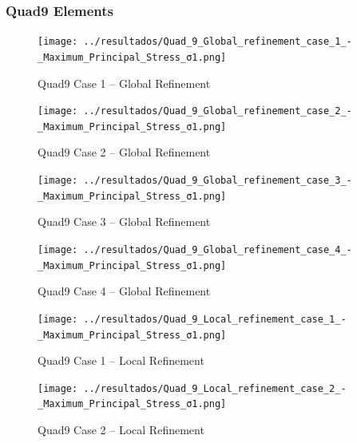 \documentclass[12pt]{article}
\begin{document}
\newpage
\subsubsection{Quad9 Elements}

\begin{figure}[H]
    \centering
    \begin{minipage}{0.48\textwidth}
        \centering
        \texttt{[image: ../resultados/Quad\_9\_Global\_refinement\_case\_1\_-\_Maximum\_Principal\_Stress\_σ1.png]}
        \caption{Quad9 Case 1 – Global Refinement}
        \label{fig:quad9_results_global1}
    \end{minipage}
    \hfill
    \begin{minipage}{0.48\textwidth}
        \centering
        \texttt{[image: ../resultados/Quad\_9\_Global\_refinement\_case\_2\_-\_Maximum\_Principal\_Stress\_σ1.png]}
        \caption{Quad9 Case 2 – Global Refinement}
        \label{fig:quad9_results_global2}
    \end{minipage}
\end{figure}

\begin{figure}[H]
    \centering
    \begin{minipage}{0.48\textwidth}
        \centering
        \texttt{[image: ../resultados/Quad\_9\_Global\_refinement\_case\_3\_-\_Maximum\_Principal\_Stress\_σ1.png]}
        \caption{Quad9 Case 3 – Global Refinement}
        \label{fig:quad9_results_global3}
    \end{minipage}
    \hfill
    \begin{minipage}{0.48\textwidth}
        \centering
        \texttt{[image: ../resultados/Quad\_9\_Global\_refinement\_case\_4\_-\_Maximum\_Principal\_Stress\_σ1.png]}
        \caption{Quad9 Case 4 – Global Refinement}
        \label{fig:quad9_results_global4}
    \end{minipage}
\end{figure}

\begin{figure}[H]
    \centering
    \begin{minipage}{0.48\textwidth}
        \centering
        \texttt{[image: ../resultados/Quad\_9\_Local\_refinement\_case\_1\_-\_Maximum\_Principal\_Stress\_σ1.png]}
        \caption{Quad9 Case 1 – Local Refinement}
        \label{fig:quad9_results_local1}
    \end{minipage}
    \hfill
    \begin{minipage}{0.48\textwidth}
        \centering
        \texttt{[image: ../resultados/Quad\_9\_Local\_refinement\_case\_2\_-\_Maximum\_Principal\_Stress\_σ1.png]}
        \caption{Quad9 Case 2 – Local Refinement}
        \label{fig:quad9_results_local2}
    \end{minipage}
\end{figure}
\end{document}
